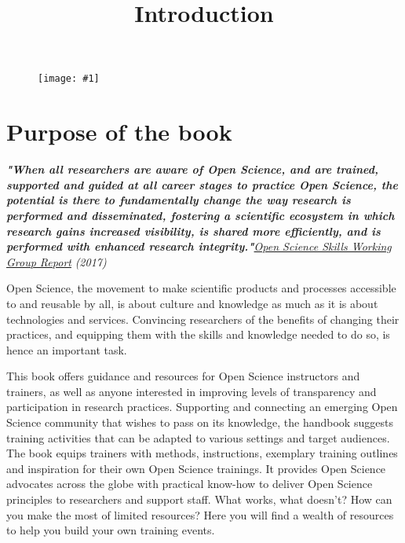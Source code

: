 \documentclass{article}
\newlength{\imgwidth}
\newcommand\scaledgraphics[2]{%
                
\settowidth{\imgwidth}{\texttt{[image: \#1]}}%
                
\setlength{\imgwidth}{\minof{\imgwidth}{#2\textwidth}}%
                
\texttt{[image: \#1]}%
                
}
\begin{document}
\title{Introduction}

\maketitle

\begin{figure}
\scaledgraphics{0ca2415e-d4af-4b8f-8b9b-cfad05b2abd5.png}{1}
\label{F60808081}
\end{figure}


\section{Purpose of the book}\label{H6454337}



\emph{\textbf{"When all researchers are aware of Open Science, and are trained, supported and guided at all career stages to practice Open Science, the potential is there to fundamentally change the way research is performed and disseminated, fostering a scientific ecosystem in which research gains increased visibility, is shared more efficiently, and is performed with enhanced research integrity."}}\emph{\href{https://ec.europa.eu/research/openscience/pdf/os_skills_wgreport_final.pdf#view=fit&pagemode=none}{Open Science Skills Working Group Report}}\emph{ (2017)}


Open Science, the movement to make scientific products and processes accessible to and reusable by all, is about culture and knowledge as much as it is about technologies and services. Convincing researchers of the benefits of changing their practices, and equipping them with the skills and knowledge needed to do so, is hence an important task.


This book offers guidance and resources for Open Science instructors and trainers, as well as anyone interested in improving levels of transparency and participation in research practices. Supporting and connecting an emerging Open Science community that wishes to pass on its knowledge, the handbook suggests training activities that can be adapted to various settings and target audiences. The book equips trainers with methods, instructions, exemplary training outlines and inspiration for their own Open Science trainings. It provides Open Science advocates across the globe with practical know-how to deliver Open Science principles to researchers and support staff. What works, what doesn’t? How can you make the most of limited resources? Here you will find a wealth of resources to help you build your own training events.
\end{document}
